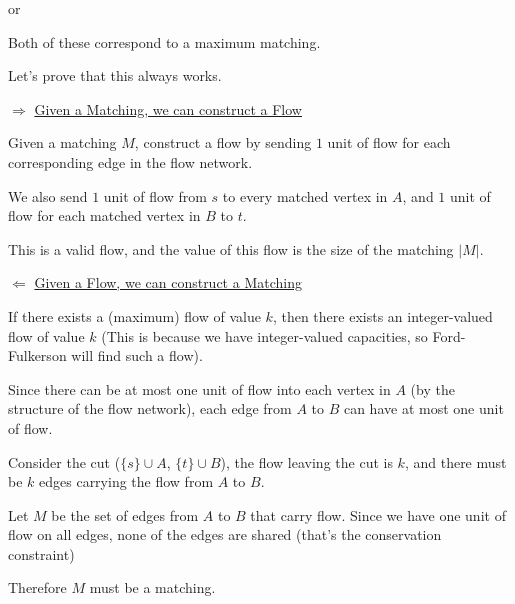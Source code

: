 \documentclass[12pt]{article}
\begin{document}
{      or

      \begin{center}
      \end{center}

      Both of these correspond to a maximum matching.
    }

    Let's prove that this always works.

    {
      $\Rightarrow$ \underline{Given a Matching, we can construct a Flow}

      Given a matching $M$, construct a flow by sending $1$ unit of flow for
      each corresponding edge in the flow network.

      We also send $1$ unit of flow from $s$ to every matched vertex in $A$, and
      $1$ unit of flow for each matched vertex in $B$ to $t$.

      This is a valid flow, and the value of this flow is the size of the
      matching $|M|$.

      $\Leftarrow$ \underline{Given a Flow, we can construct a Matching}

      If there exists a (maximum) flow of value $k$, then there exists an
      integer-valued flow of value $k$ (This is because we have integer-valued
      capacities, so Ford-Fulkerson will find such a flow).

      Since there can be at most one unit of flow into each vertex in $A$ (by
      the structure of the flow network), each edge from $A$ to $B$ can have at
      most one unit of flow.

      Consider the cut ($\{s\} \cup A$, $\{t\} \cup B$), the flow leaving the
      cut is $k$, and there must be $k$ edges carrying the flow from $A$ to $B$.

      Let $M$ be the set of edges from $A$ to $B$ that carry flow. Since we have
      one unit of flow on all edges, none of the edges are shared (that's the
      conservation constraint)

      Therefore $M$ must be a matching.
    }
\end{document}
